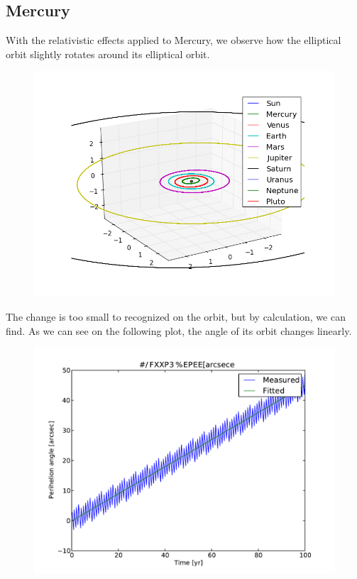 \documentclass[10pt]{article}
\begin{document}
\begin{multicols}{2}
\subsection{Mercury}
With the relativistic effects applied to Mercury, we observe how the
elliptical orbit slightly rotates around its elliptical orbit. 

\begin{figure}[H]
    \centering
    \includegraphics[width=1.0\linewidth]{../results/full_system_inner.png}
    \label{fig:name}
\end{figure}
The change is too small to recognized on the orbit, but by calculation, we
can find. As we can see on the following plot, the angle of its orbit
changes linearly.
\begin{figure}[H]
    \centering
    \includegraphics[width=1.0\linewidth]{../results/peri_precession}
    \label{fig:name}
\end{figure}



\end{multicols}
\end{document}
